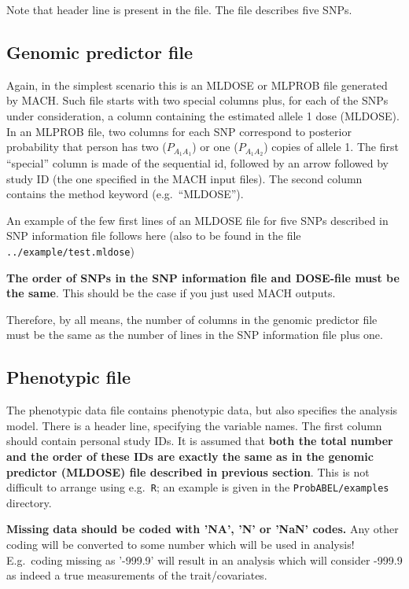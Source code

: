 \documentclass[12pt,a4paper]{article}
\begin{document}


Note that header line is present in the file. The file describes 
five SNPs. 

\subsection{Genomic predictor file}
\label{ssec:dosein}

Again, in the simplest scenario this is an MLDOSE or MLPROB file generated by MACH.
Such file starts with two special columns plus, for each of the SNPs 
under consideration, a column containing the estimated allele 1 dose (MLDOSE).
In an MLPROB file, two columns for each SNP correspond to posterior probability 
that person has two ($P_{A_1A_1}$) or one ($P_{A_1A_2}$) copies of allele 1. 
The first ``special'' column is made of the sequential id, 
followed by an arrow followed by study ID (the one specified in the
MACH input files). The second column contains the method  keyword
(e.g.~``MLDOSE'').

An example of the few first lines of an MLDOSE file for 
five SNPs described in SNP information file follows here (also 
to be found in the file \texttt{../example/test.mldose})



\textbf{The order of SNPs in the SNP information file and DOSE-file
must be the same}. This should be the case if you just used MACH outputs.

Therefore, by all means, the number of columns in the genomic predictor file 
must be the same as the number of lines in the SNP information file plus one. 

\subsection{Phenotypic file}
\label{ssec:phenoin}

The phenotypic data file contains phenotypic data, but also specifies the 
analysis model. There is a header line, specifying the variable names. 
The first column should contain personal study IDs. It is assumed 
that \textbf{both the total number and the order of these IDs are 
exactly the same as in the genomic predictor (MLDOSE) file described in 
previous section}. This is not difficult to arrange using e.g.~\texttt{R}; 
an example is given in the \texttt{ProbABEL/examples} directory. 

\textbf{Missing data should be coded with 'NA', 'N' or 'NaN' codes.} Any 
other coding will be converted to some number which will be used in 
analysis! E.g.~coding missing as '-999.9' will result in an analysis which 
will consider -999.9 as indeed a true measurements of the trait/covariates.  
\end{document}
